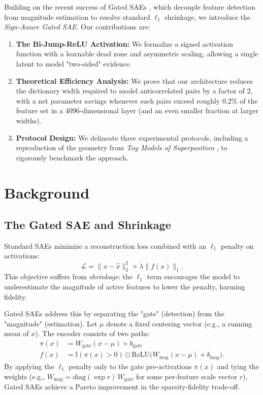 \documentclass{article}
\begin{document}
Building on the recent success of Gated SAEs \cite{rajamanoharan2024gated}, which decouple feature detection from magnitude estimation to resolve standard $\ell_1$ shrinkage, we introduce the \textit{Sign-Aware Gated SAE}. Our contributions are:

\begin{enumerate}
    \item \textbf{The Bi-Jump-ReLU Activation:} We formalize a signed activation function with a learnable dead zone and asymmetric scaling, allowing a single latent to model "two-sided" evidence.
    \item \textbf{Theoretical Efficiency Analysis:} We prove that our architecture reduces the dictionary width required to model anticorrelated pairs by a factor of 2, with a net parameter savings whenever such pairs exceed roughly $0.2\%$ of the feature set in a 4096-dimensional layer (and an even smaller fraction at larger widths).
    \item \textbf{Protocol Design:} We delineate three experimental protocols, including a reproduction of the geometry from \textit{Toy Models of Superposition} \cite{elhage2022toy}, to rigorously benchmark the approach.
\end{enumerate}


\section{Background}

\subsection{The Gated SAE and Shrinkage}
Standard SAEs minimize a reconstruction loss combined with an $\ell_1$ penalty on activations:
\[
    \mathcal{L} = \|x - \hat{x}\|_2^2 + \lambda \|f(x)\|_1.
\]
This objective suffers from \textit{shrinkage}: the $\ell_1$ term encourages the model to underestimate the magnitude of active features to lower the penalty, harming fidelity.

Gated SAEs address this by separating the "gate" (detection) from the "magnitude" (estimation). Let $\mu$ denote a fixed centering vector (e.g., a running mean of $x$). The encoder consists of two paths:
\begin{align}
    \pi(x) &= W_{\text{gate}}(x - \mu) + b_{\text{gate}} \\
    f(x) &= \mathbb{I}(\pi(x) > 0) \odot \text{ReLU}\big(W_{\text{mag}}(x - \mu) + b_{\text{mag}}\big).
\end{align}
By applying the $\ell_1$ penalty only to the gate pre-activations $\pi(x)$ and tying the weights (e.g., $W_{\text{mag}} = \mathrm{diag}(\exp r)\, W_{\text{gate}}$ for some per-feature scale vector $r$), Gated SAEs achieve a Pareto improvement in the sparsity-fidelity trade-off.
\end{document}

